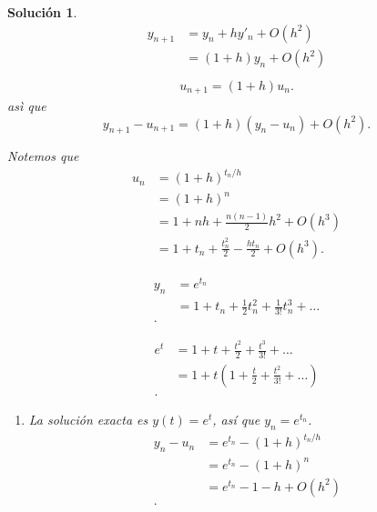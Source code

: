\documentclass[11pt]{article}
\newtheorem*{sol}{Solución}
\begin{document}
\begin{sol}

  \begin{align}
    y_{n+1}
    &= y_n + hy'_n + O(h^{2}) \\
    &= (1 + h)y_n + O(h^{2}) \\
  \end{align}
  \begin{align}
    u_{n+1} = (1 + h)u_n
  .\end{align}
  asì que
  \begin{equation}
    y_{n+1}-u_{n+1}
    = (1+h)(y_n-u_n) + O(h^{2})
  .\end{equation}
  
  Notemos que
  \begin{align}
    u_n
    &= (1+h)^{t_n/h} \\
    &= (1+h)^{n} \\
    &= 1 + nh + \frac{n(n-1)}{2} h^{2} + O(h^{3}) \\
    &= 1 + t_n + \frac{t_n^{2}}{2} - \frac{ht_n}{2} + O(h^{3})
  .\end{align}
  
  \begin{align}
    y_n
    &= e^{t_n} \\
    &= 1 + t_n + \frac{1}{2}t_n^{2} + \frac{1}{3!}t_n^{3} + \dots \\
  .\end{align}
  
  
  \begin{align}
    e^{t}
    &= 1 + t + \frac{t^{2}}{2} + \frac{t^{3}}{3!} + \dots \\
    &= 1 + t(1 + \frac{t}{2} + \frac{t^{2}}{3!} + \dots) \\
  .\end{align}
  
  
  
  \begin{enumerate}
    \item
      La solución exacta es $y(t)=e^t$, así que $y_n=e^{t_n}$.
      \begin{align}
        y_n - u_n
        &= e^{t_n} - (1+h)^{t_n/h} \\
        &= e^{t_n} - (1+h)^{n} \\
        &= e^{t_n} - 1 - h + O(h^{2}) \\
      .\end{align}
  \end{enumerate}
\end{sol}
\end{document}
